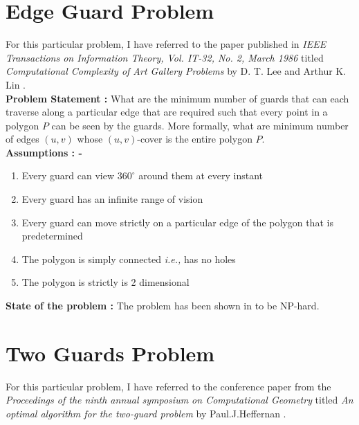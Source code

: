 \documentclass{article}
\begin{document}
\section{Edge Guard Problem}

For this particular problem, I have referred to the paper published in \textit{IEEE Transactions on Information Theory, Vol. IT-32, No. 2, March 1986} titled \textit{Computational Complexity of Art Gallery Problems} by D. T. Lee and Arthur K. Lin \cite{lee1986computational}. \\

\noindent \textbf{Problem Statement :} What are the minimum number of guards that can each traverse along a particular edge that are required such that every point in a polygon $P$ can be seen by the guards. More formally, what are minimum number of edges $(u, v)$ whose $(u, v)$-cover is the entire polygon $P$. \\

\noindent \textbf{Assumptions : -}

\begin{enumerate}

	\item Every guard can view $360 ^ \circ$ around them at every instant
	
	\item Every guard has an infinite range of vision
	
	 \item Every guard can move strictly on a particular edge of the polygon that is predetermined
	
	\item The polygon is simply connected \textit{i.e.,} has no holes
	
	\item The polygon is strictly is 2 dimensional
	
\end{enumerate}

\noindent \textbf{State of the problem :} The problem has been shown in \cite{lee1986computational} to be NP-hard.

\section{Two Guards Problem}

For this particular problem, I have referred to the conference paper from the \textit{Proceedings of the ninth annual symposium on Computational Geometry} titled \textit{An optimal algorithm for the two-guard problem} by Paul.J.Heffernan \cite{heffernan1993optimal}. \\
\end{document}
